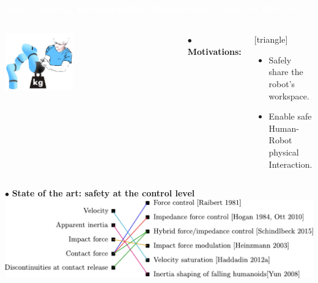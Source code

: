 \begin{frame}[noframenumbering]
  \frametitle{{\textcolor{white}{\hspace{0.3cm}Safety during Human-Robot Interaction -- state of the art}}}
  
 \vspace{-3mm} 
\begin{columns}
\column{.47\paperwidth}
\vspace{-5mm}
\begin{center}
\vspace{2mm}
\includegraphics[width=0.4\textwidth ]{figures/Human_robot_int.png}
\end{center}
 \vspace{-3mm} 
\column{.47\paperwidth}
$\bullet$ \textbf{Motivations:}                     
\begin{center}
[triangle]                        
\begin{itemize}
\item Safely share the robot's workspace.
\item Enable safe Human-Robot physical Interaction.
\end{itemize}                                            
\end{center}
\end{columns}

\vspace{7mm}
\hspace{-4mm}
$\bullet$ \textbf{State of the art: safety at the control level}
\vspace{6mm}
\includegraphics[width=1.0\textwidth]{figures/sttt.pdf}
\vspace{-1mm}


\end{frame}
